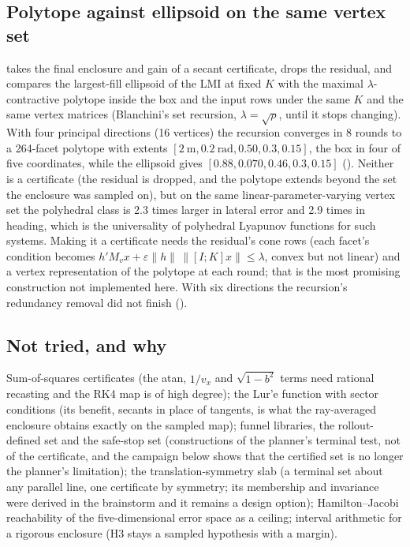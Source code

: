 \documentclass[11pt]{article}
\begin{document}
\subsection{Polytope against ellipsoid on the same vertex set}
 takes the final enclosure and gain of a
secant certificate, drops the residual, and compares the largest-fill
ellipsoid of the LMI at fixed $K$ with the maximal $\lambda$-contractive
polytope inside the box and the input rows under the same $K$ and the same
vertex matrices (Blanchini's set recursion, $\lambda=\sqrt{\rho}$, until it
stops changing). With four principal directions (16 vertices) the recursion
converges in 8 rounds to a 264-facet polytope with extents
$[2~\text{m},0.2~\text{rad},0.50,0.3,0.15]$, the box in four of five
coordinates, while the ellipsoid gives $[0.88,0.070,0.46,0.3,0.15]$
(). Neither is a certificate (the residual
is dropped, and the polytope extends beyond the set the enclosure was sampled
on), but on the same linear-parameter-varying vertex set the polyhedral class
is 2.3 times larger in lateral error and 2.9 times in heading, which is the
universality of polyhedral Lyapunov functions for such systems. Making it a
certificate needs the residual's cone rows (each facet's condition becomes
$h'M_vx+\varepsilon\|h\|\,\|[I;K]x\|\le\lambda$, convex but not linear) and a
vertex representation of the polytope at each round; that is the most
promising construction not implemented here. With six directions the
recursion's redundancy removal did not finish
().

\subsection{Not tried, and why}
Sum-of-squares certificates (the atan, $1/v_x$ and $\sqrt{1-b^2}$ terms need
rational recasting and the RK4 map is of high degree); the Lur'e function with
sector conditions (its benefit, secants in place of tangents, is what the
ray-averaged enclosure obtains exactly on the sampled map); funnel libraries,
the rollout-defined set and the safe-stop set (constructions of the planner's
terminal test, not of the certificate, and the campaign below shows that the
certified set is no longer the planner's limitation); the translation-symmetry
slab (a terminal set about any parallel line, one certificate by symmetry;
its membership and invariance were derived in the brainstorm and it remains a
design option); Hamilton--Jacobi reachability of the five-dimensional error
space as a ceiling; interval arithmetic for a rigorous enclosure (H3 stays a
sampled hypothesis with a margin).
\end{document}
